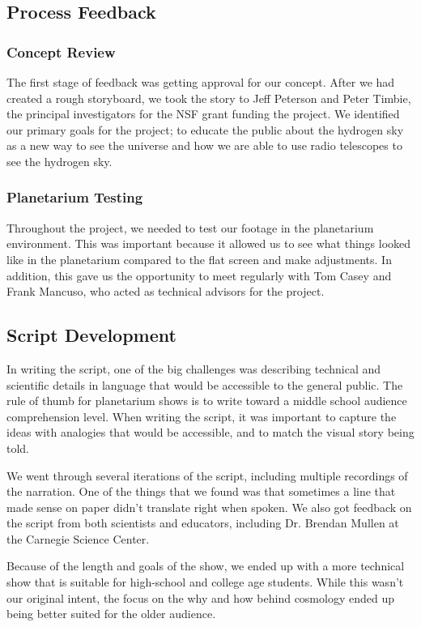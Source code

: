\subsection{Process Feedback}

\subsubsection{Concept Review}
The first stage of feedback was getting approval for our concept. After we had created a rough storyboard, we took the story to Jeff Peterson and Peter Timbie, the principal investigators for the NSF grant funding the project. We identified our primary goals for the project; to educate the public about the hydrogen sky as a new way to see the universe and how we are able to use radio telescopes to see the hydrogen sky. 

\subsubsection{Planetarium Testing}
Throughout the project, we needed to test our footage in the planetarium environment. This was important because it allowed us to see what things looked like in the planetarium compared to the flat screen and make adjustments. In addition, this gave us the opportunity to meet regularly with Tom Casey and Frank Mancuso, who acted as technical advisors for the project. 

\subsection{Script Development}
In writing the script, one of the big challenges was describing technical and scientific details in language that would be accessible to the general public. The rule of thumb for planetarium shows is to write toward a middle school audience comprehension level. When writing the script, it was important to capture the ideas with analogies that would be accessible, and to match the visual story being told. 

We went through several iterations of the script, including multiple recordings of the narration. One of the things that we found was that sometimes a line that made sense on paper didn't translate right when spoken. We also got feedback on the script from both scientists and educators, including Dr. Brendan Mullen at the Carnegie Science Center. 

Because of the length and goals of the show, we ended up with a more technical show that is suitable for high-school and college age students. While this wasn't our original intent, the focus on the why and how behind \cm cosmology ended up being better suited for the older audience. 

